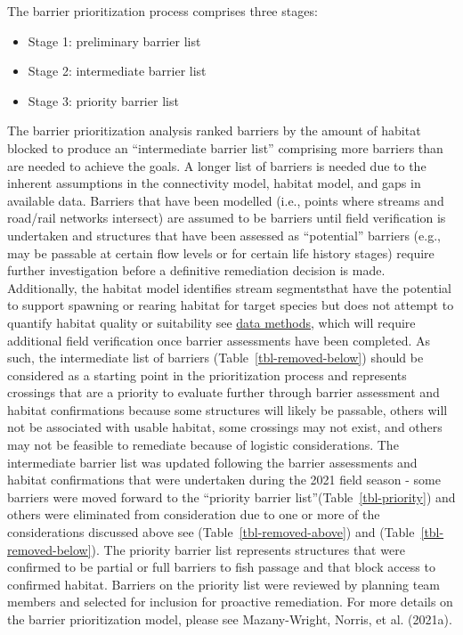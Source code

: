 \documentclass[
  letterpaper,
  DIV=11,
  numbers=noendperiod]{scrreprt}
\begin{document}
The barrier prioritization process comprises three stages:

\begin{itemize}
\item
  Stage 1: preliminary barrier list
\item
  Stage 2: intermediate barrier list
\item
  Stage 3: priority barrier list
\end{itemize}

The barrier prioritization analysis ranked barriers by the amount of
habitat blocked to produce an ``intermediate barrier list'' comprising
more barriers than are needed to achieve the goals. A longer list of
barriers is needed due to the inherent assumptions in the connectivity
model, habitat model, and gaps in available data. Barriers that have
been modelled (i.e., points where streams and road/rail networks
intersect) are assumed to be barriers until field verification is
undertaken and structures that have been assessed as ``potential''
barriers (e.g., may be passable at certain flow levels or for certain
life history stages) require further investigation before a definitive
remediation decision is made. Additionally, the habitat model identifies
stream segmentsthat have the potential to support spawning or rearing
habitat for target species but does not attempt to quantify habitat
quality or suitability see \href{data-methods.qmd}{data methods}, which
will require additional field verification once barrier assessments have
been completed. As such, the intermediate list of barriers
(Table~\ref{tbl-removed-below}) should be considered as a starting point
in the prioritization process and represents crossings that are a
priority to evaluate further through barrier assessment and habitat
confirmations because some structures will likely be passable, others
will not be associated with usable habitat, some crossings may not
exist, and others may not be feasible to remediate because of logistic
considerations. The intermediate barrier list was updated following the
barrier assessments and habitat confirmations that were undertaken
during the 2021 field season - some barriers were moved forward to the
``priority barrier list''(Table~\ref{tbl-priority}) and others were
eliminated from consideration due to one or more of the considerations
discussed above see (Table~\ref{tbl-removed-above}) and
(Table~\ref{tbl-removed-below}). The priority barrier list represents
structures that were confirmed to be partial or full barriers to fish
passage and that block access to confirmed habitat. Barriers on the
priority list were reviewed by planning team members and selected for
inclusion for proactive remediation. For more details on the barrier
prioritization model, please see Mazany-Wright, Norris, et al. (2021a).
\end{document}
